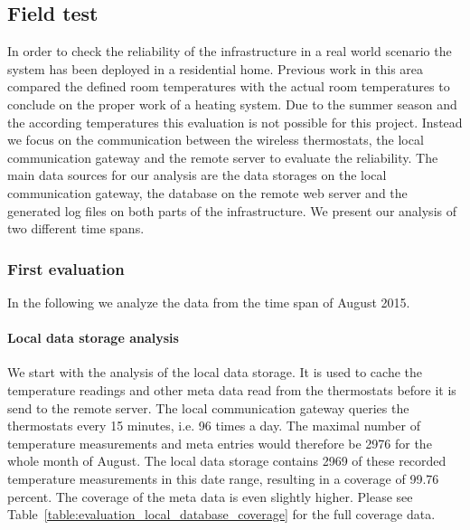 \subsection{Field test}
\label{sec:evaluation_field_test}

In order to check the reliability of the infrastructure in a real world scenario the system has been deployed in a residential home.
Previous work in this area compared the defined room temperatures with the actual room temperatures to conclude on the proper work of a heating system\cite{eigenmann2012opportunisticSensing}.
Due to the summer season and the according temperatures this evaluation is not possible for this project.
Instead we focus on the communication between the wireless thermostats, the local communication gateway and the remote server to evaluate the reliability.
The main data sources for our analysis are the data storages on the local communication gateway, the database on the remote web server and the generated log files on both parts of the infrastructure.
We present our analysis of two different time spans.

\subsubsection{First evaluation}

In the following we analyze the data from the time span of August 2015.

\paragraph{Local data storage analysis}


We start with the analysis of the local data storage.
It is used to cache the temperature readings and other meta data read from the thermostats before it is send to the remote server.
The local communication gateway queries the thermostats every 15 minutes, i.e. 96 times a day.
The maximal number of temperature measurements and meta entries would therefore be 2976 for the whole month of August.
The local data storage contains 2969 of these recorded temperature measurements in this date range, resulting in a coverage of 99.76 percent.
The coverage of the meta data is even slightly higher.
Please see Table~\ref{table:evaluation_local_database_coverage} for the full coverage data.

